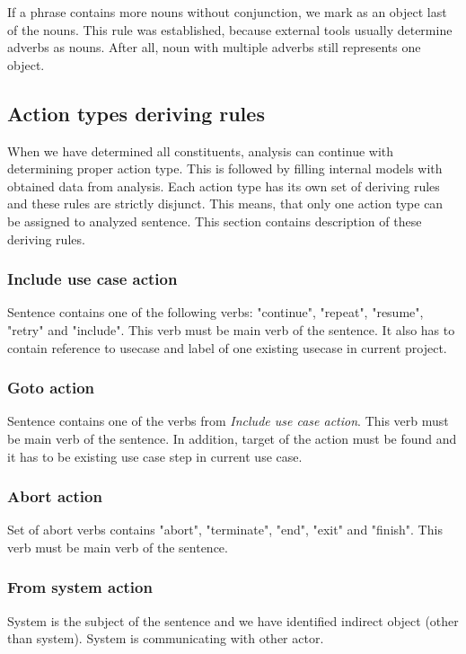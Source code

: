 If a phrase contains more nouns without conjunction, we mark as an object last of the nouns. This rule was established, because external tools usually determine adverbs as nouns. After all, noun with multiple adverbs still represents one object.

\subsection{Action types deriving rules}
\label{sec:actiontypes}
When we have determined all constituents, analysis can continue with determining proper action type. This is followed by filling internal models with obtained data from analysis. Each action type has its own set of deriving rules and these rules are strictly disjunct. This means, that only one action type can be assigned to analyzed sentence. This section contains description of these deriving rules. 

\subsubsection{Include use case action}
Sentence contains one of the following verbs: "continue", "repeat", "resume", "retry" and "include".  This verb must be main verb of the sentence. It also has to contain reference to usecase and label of one existing usecase in current project.

\subsubsection{Goto action}
Sentence contains one of the verbs from \emph{Include use case action}. This verb must be main verb of the sentence. In addition, target of the action must be found and it has to be existing use case step in current use case. 

\subsubsection{Abort action}
Set of abort verbs contains "abort", "terminate", "end", "exit" and "finish".  This verb must be main verb of the sentence.

\subsubsection{From system action}
System is the subject of the sentence and we have identified indirect object (other than system). System is communicating with other actor.

